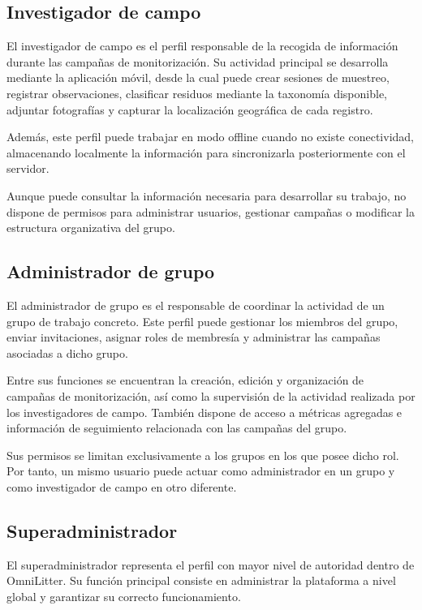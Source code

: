 \subsection{Investigador de campo}

El investigador de campo es el perfil responsable de la recogida de información durante las campañas de monitorización. Su actividad principal se desarrolla mediante la aplicación móvil, desde la cual puede crear sesiones de muestreo, registrar observaciones, clasificar residuos mediante la taxonomía disponible, adjuntar fotografías y capturar la localización geográfica de cada registro.

Además, este perfil puede trabajar en modo offline cuando no existe conectividad, almacenando localmente la información para sincronizarla posteriormente con el servidor.

Aunque puede consultar la información necesaria para desarrollar su trabajo, no dispone de permisos para administrar usuarios, gestionar campañas o modificar la estructura organizativa del grupo.

\subsection{Administrador de grupo}

El administrador de grupo es el responsable de coordinar la actividad de un grupo de trabajo concreto. Este perfil puede gestionar los miembros del grupo, enviar invitaciones, asignar roles de membresía y administrar las campañas asociadas a dicho grupo.

Entre sus funciones se encuentran la creación, edición y organización de campañas de monitorización, así como la supervisión de la actividad realizada por los investigadores de campo. También dispone de acceso a métricas agregadas e información de seguimiento relacionada con las campañas del grupo.

Sus permisos se limitan exclusivamente a los grupos en los que posee dicho rol. Por tanto, un mismo usuario puede actuar como administrador en un grupo y como investigador de campo en otro diferente.

\subsection{Superadministrador}

El superadministrador representa el perfil con mayor nivel de autoridad dentro de OmniLitter. Su función principal consiste en administrar la plataforma a nivel global y garantizar su correcto funcionamiento.


